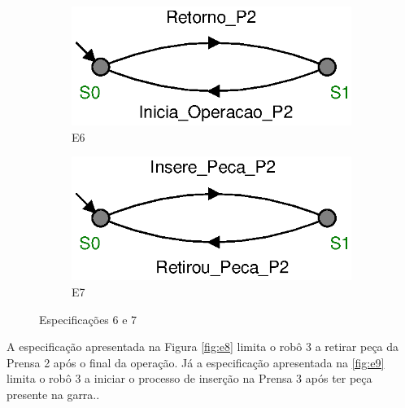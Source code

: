 \begin{figure}[H]%
  \centering
  \begin{subfigure}{0.45\textwidth}
      \centering
      \includegraphics[width=\textwidth]{imagens/E6.eps}
      \caption{E6}
      \label{fig:e6}
  \end{subfigure}
  \hfill
  \begin{subfigure}{0.45\textwidth}
      \centering
      \includegraphics[width=\textwidth]{imagens/E7.eps}
      \caption{E7}
      \label{fig:e7}
  \end{subfigure}
  \caption{Especificações 6 e 7}
  \label{fig:e67}
\end{figure}

A especificação apresentada na Figura \ref{fig:e8} limita o robô 3 a retirar peça da Prensa 2 após o final da operação.
Já a especificação apresentada na \ref{fig:e9} limita o robô 3 a iniciar o processo de inserção na Prensa 3 após ter peça presente na garra..


